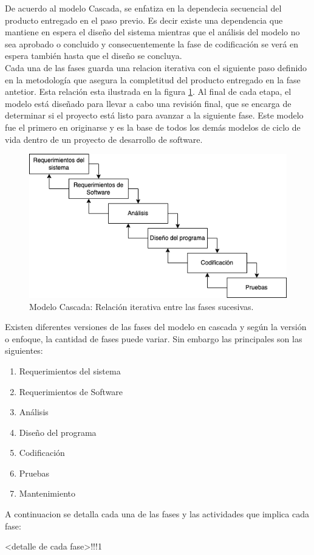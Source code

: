 De acuerdo al modelo Cascada, se enfatiza en la dependecia secuencial del producto entregado en el paso previo. Es decir existe una dependencia que mantiene en espera el diseño del sistema mientras que el análisis del modelo no sea aprobado o concluido y consecuentemente la fase de codificación se verá en espera también hasta que el diseño se concluya.\\

Cada una de las fases guarda una relacion iterativa con el siguiente paso definido en la metodología que asegura la completitud del producto entregado en la fase antetior. Esta relación esta ilustrada en la figura \ref{fig:cascada_iterativa}. Al final de cada etapa, el modelo está diseñado para llevar a cabo una revisión final, que se encarga de determinar si el proyecto está listo para avanzar a la siguiente fase. Este modelo fue el primero en originarse y es la base de todos los demás modelos de ciclo de vida dentro de un proyecto de desarrollo de software.\\

\begin{figure}[H]
    \begin{center}
        \includegraphics[width=12cm]{img/capitulo_2/cascada_iterativa.png}
    \end{center}
    \caption{Modelo Cascada: Relación iterativa entre las fases sucesivas.}
    \label{fig:cascada_iterativa}
\end{figure}

Existen diferentes versiones de las fases del modelo en cascada y según la versión o enfoque, la cantidad de fases puede variar. Sin embargo las principales son las siguientes:

\begin{enumerate}
    \item Requerimientos del sistema
    \item Requerimientos de Software
    \item Análisis
    \item Diseño del programa
    \item Codificación
    \item Pruebas
    \item Mantenimiento 
\end{enumerate}

A continuacion se detalla cada una de las fases y las actividades que implica cada fase:

<detalle de cada fase>!!!1
